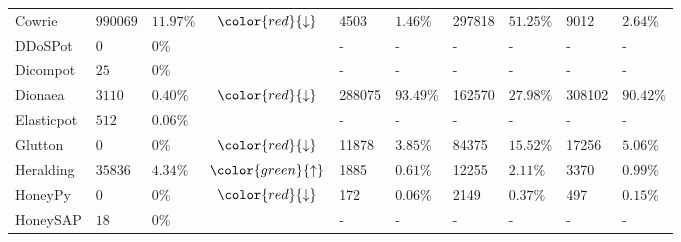 \begin{table}
\begin{tabularx}{\linewidth}{l|XXc|XX|XX|XX}
        Cowrie             & $990069$                               & $11.97\%$                               & $\color{red}{\downarrow}$                                 & 4503                               & $1.46\%$      & 297818          & $51.25\%$     & 9012            & $2.64\%$      \\
        DDoSPot            & $0$                                    & $0\%$                                   &                                  & -                                  & -             & -               & -             & -               & -             \\
        Dicompot           & $25$                                   & $0\%$                                   &                                  & -                                  & -             & -               & -             & -               & -             \\
        Dionaea            & $3110$                                 & $0.40\%$                                & $\color{red}{\downarrow}$                                 & 288075                             & $93.49\%$     & 162570          & $27.98\%$     & 308102          & $90.42\%$     \\
        Elasticpot         & $512$                                  & $0.06\%$                                &                                  & -                                  & -             & -               & -             & -               & -             \\
        Glutton            & $0$                                    & $0\%$                                   & $\color{red}{\downarrow}$                                 & 11878                              & $3.85\%$      & 84375           & $15.52\%$     & 17256           & $5.06\%$      \\
        Heralding          & $35836$                                & $4.34\%$                                & $\color{green}{\uparrow}$                                 & 1885                               & $0.61\%$      & 12255           & $2.11\%$      & 3370            & $0.99\%$      \\
        HoneyPy            & $0$                                    & $0\%$                                   & $\color{red}{\downarrow}$                                 & 172                                & $0.06\%$      & 2149            & $0.37\%$      & 497             & $0.15\%$      \\
        HoneySAP           & $18$                                   & $0\%$                                   &                                  & -                                  & -             & -               & -             & -               & -             \\

\end{tabularx}
\end{table}
